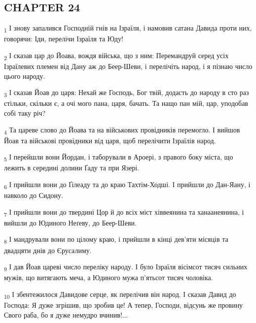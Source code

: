 \subsection{CHAPTER 24}
\begin{tcolorbox}
\textsubscript{1} І знову запалився Господній гнів на Ізраїля, і намовив сатана Давида проти них, говорячи: Іди, перелічи Ізраїля та Юду!
\end{tcolorbox}
\begin{tcolorbox}
\textsubscript{2} І сказав цар до Йоава, вождя війська, що з ним: Перемандруй серед усіх Ізраїлевих племен від Дану аж до Беер-Шеви, і перелічіть народ, і я пізнаю число цього народу.
\end{tcolorbox}
\begin{tcolorbox}
\textsubscript{3} І сказав Йоав до царя: Нехай же Господь, Бог твій, додасть до народу в сто раз стільки, скільки є, а очі мого пана, царя, бачать. Та нащо пан мій, цар, уподобав собі таку річ?
\end{tcolorbox}
\begin{tcolorbox}
\textsubscript{4} Та цареве слово до Йоава та на військових провідників перемогло. І вийшов Йоав та військові провідники від царя, щоб перелічити Ізраїлів народ.
\end{tcolorbox}
\begin{tcolorbox}
\textsubscript{5} І перейшли вони Йордан, і таборували в Ароері, з правого боку міста, що лежить в середині долини Ґаду та при Язері.
\end{tcolorbox}
\begin{tcolorbox}
\textsubscript{6} І прийшли вони до Ґілеаду та до краю Тахтім-Ходші. І прийшли до Дан-Яану, і навколо до Сидону.
\end{tcolorbox}
\begin{tcolorbox}
\textsubscript{7} І прийшли вони до твердині Цор й до всіх міст хіввеянина та ханаанеянина, і вийшли до Юдиного Неґеву, до Беер-Шеви.
\end{tcolorbox}
\begin{tcolorbox}
\textsubscript{8} І мандрували вони по цілому краю, і прийшли в кінці дев'яти місяців та двадцяти днів до Єрусалиму.
\end{tcolorbox}
\begin{tcolorbox}
\textsubscript{9} І дав Йоав цареві число переліку народу. І було Ізраїля вісімсот тисяч сильних мужів, що витягають меча, а Юдиного мужа п'ятьсот тисяч чоловіка.
\end{tcolorbox}
\begin{tcolorbox}
\textsubscript{10} І збентежилося Давидове серце, як перелічив він народ. І сказав Давид до Господа: Я дуже згрішив, що зробив це! А тепер, Господи, відсунь же провину Свого раба, бо я дуже немудро вчинив!...
\end{tcolorbox}
